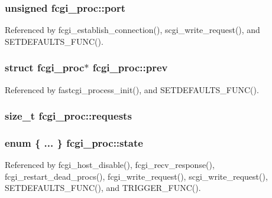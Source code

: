 \hypertarget{structfcgi__proc_a26eb68bd383c86881d334c51bca1ad43}{
\subsubsection[{port}]{\setlength{\rightskip}{0pt plus 5cm}unsigned fcgi\-\_\-proc\-::port}}\label{structfcgi__proc_a26eb68bd383c86881d334c51bca1ad43}


Referenced by fcgi\-\_\-establish\-\_\-connection(), scgi\-\_\-write\-\_\-request(), and S\-E\-T\-D\-E\-F\-A\-U\-L\-T\-S\-\_\-\-F\-U\-N\-C().

\hypertarget{structfcgi__proc_aa7ff4495570487c9eabd7ab8e86512d5}{
\subsubsection[{prev}]{\setlength{\rightskip}{0pt plus 5cm}struct {\bf fcgi\-\_\-proc}$\ast$ fcgi\-\_\-proc\-::prev}}\label{structfcgi__proc_aa7ff4495570487c9eabd7ab8e86512d5}


Referenced by fastcgi\-\_\-process\-\_\-init(), and S\-E\-T\-D\-E\-F\-A\-U\-L\-T\-S\-\_\-\-F\-U\-N\-C().

\hypertarget{structfcgi__proc_a946799f5e5f7acca4b65a0dcfe77130a}{
\subsubsection[{requests}]{\setlength{\rightskip}{0pt plus 5cm}size\-\_\-t fcgi\-\_\-proc\-::requests}}\label{structfcgi__proc_a946799f5e5f7acca4b65a0dcfe77130a}
\hypertarget{structfcgi__proc_a65ab1b24558460a774b89fa6e15819b3}{
\subsubsection[{state}]{\setlength{\rightskip}{0pt plus 5cm}enum \{ ... \}   fcgi\-\_\-proc\-::state}}\label{structfcgi__proc_a65ab1b24558460a774b89fa6e15819b3}


Referenced by fcgi\-\_\-host\-\_\-disable(), fcgi\-\_\-recv\-\_\-response(), fcgi\-\_\-restart\-\_\-dead\-\_\-procs(), fcgi\-\_\-write\-\_\-request(), scgi\-\_\-write\-\_\-request(), S\-E\-T\-D\-E\-F\-A\-U\-L\-T\-S\-\_\-\-F\-U\-N\-C(), and T\-R\-I\-G\-G\-E\-R\-\_\-\-F\-U\-N\-C().

